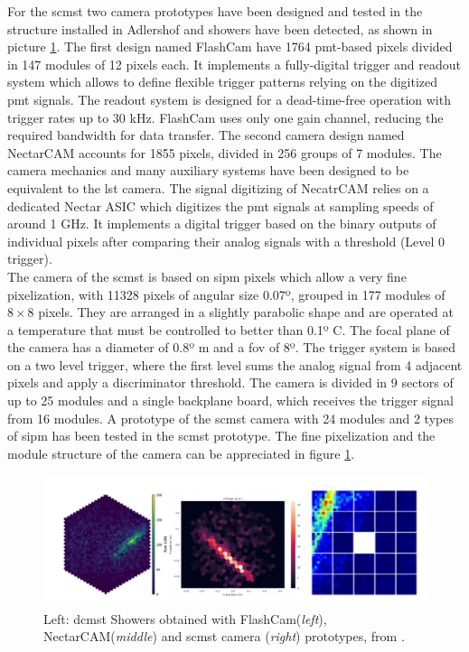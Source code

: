 \documentclass[main.tex]{subfiles}
\begin{document}
For the \gls{scmst} two camera prototypes have been designed and tested in the structure installed in Adlershof and showers have been detected, as shown in picture \ref{fig:MSTcamerasimg}.
The first design named FlashCam have 1764 \gls{pmt}-based pixels divided in 147 modules of 12 pixels each. It implements a fully-digital trigger and readout system which allows to define flexible trigger patterns relying on the digitized \gls{pmt} signals. The readout system is designed for a dead-time-free operation with trigger rates up to 30 kHz. FlashCam uses only one gain channel, reducing the required bandwidth for data transfer. 
The second camera design named NectarCAM accounts for 1855 pixels, divided in 256 groups of 7 modules. The camera mechanics and many auxiliary systems have been designed to be equivalent to the \gls{lst} camera. The signal digitizing of NecatrCAM relies on a dedicated Nectar ASIC which digitizes the \gls{pmt} signals at sampling speeds of around 1 GHz. It implements a digital trigger based on the binary outputs of individual pixels after comparing their analog signals with a threshold (Level 0 trigger).\\
The camera of the \gls{scmst} is based on \gls{sipm} pixels which allow a very fine pixelization, with 11328 pixels of angular size 0.07º, grouped in 177 modules of $8\times8$ pixels. They are arranged in a slightly parabolic shape and are operated at a temperature that must be controlled to better than 0.1º C. The focal plane of the camera has a diameter of 0.8º m and a \gls{fov} of 8º. The trigger system is based on a two level trigger, where the first level sums the analog signal from 4 adjacent pixels and apply a discriminator threshold. The camera is divided in 9 sectors of up to 25 modules and a single backplane board, which receives the trigger signal from 16 modules. A prototype of the \gls{scmst} camera with 24 modules and 2 types of \gls{sipm} has been tested in the \gls{scmst} prototype. The fine pixelization and the module structure of the camera can be appreciated in figure \ref{fig:MSTcamerasimg}. 

\begin{figure}
\centering
 \includegraphics[width=\textwidth]{Pictures/showerimagesMST.pdf}
  \caption{Left: \gls{dcmst} Showers obtained with FlashCam(\textit{left}), NectarCAM(\textit{middle}) and \gls{scmst} camera (\textit{right}) prototypes, from \cite{2019MSTreport}.}
    \label{fig:MSTcamerasimg}
\end{figure}
\end{document}
